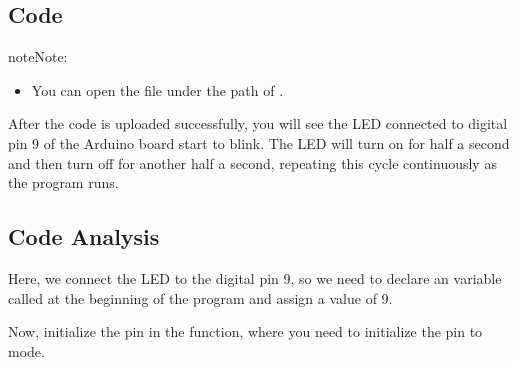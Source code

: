 \documentclass[a4paper,11pt,english]{sphinxmanual}
\begin{document}
\subsection{Code}
\label{\detokenize{Basic_Project/LED_Blink:code}}
\begin{sphinxadmonition}{note}{Note:}\begin{itemize}
\item {} 
\sphinxAtStartPar
You can open the file  under the path of .

\end{itemize}
\end{sphinxadmonition}

\sphinxAtStartPar
After the code is uploaded successfully, you will see the LED connected to digital pin 9 of the Arduino board start to blink. The LED will turn on for half a second and then turn off for another half a second, repeating this cycle continuously as the program runs.


\subsection{Code Analysis}
\label{\detokenize{Basic_Project/LED_Blink:code-analysis}}
\sphinxAtStartPar
Here, we connect the LED to the digital pin 9, so we need to declare an  variable called  at the beginning of the program and assign a value of 9.

\begin{sphinxVerbatim}[commandchars=\\\{\}]
\end{sphinxVerbatim}

\sphinxAtStartPar
Now, initialize the pin in the  function, where you need to initialize the pin to  mode.

\begin{sphinxVerbatim}[commandchars=\\\{\}]
\end{sphinxVerbatim}
\end{document}
